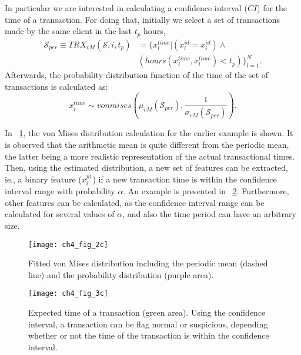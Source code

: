   In particular we are interested in calculating a confidence interval ($CI$)   for the time of a 
  transaction. For doing that, initially we select a set of transactions made by  the same client 
  in the last $t_p$ hours,
  \begin{align}\label{eq:4:pe_features1}
    \mathcal{S}_{per} \equiv TRX_{vM}(\mathcal{S},i, t_p) & = \bigg\{ x_l^{time} \bigg\vert   
    \left(x_l^{id}=x_i^{id}\right)\wedge \nonumber \\
    &\left(hours(x_i^{time},x_l^{time})< t_p\right)    \bigg\}_{l=1}^N.
  \end{align}
  Afterwards, the probability distribution function of the time of the set of transactions is 
  calculated as:
  \begin{equation}
   x_i^{time} \sim vonmises\left(\mu_{vM}(\mathcal{S}_{per}), 
  \frac{1}{\sigma_{vM}(\mathcal{S}_{per})} \right).
  \end{equation}
  
  
  In \figurename{~\ref{fig:4:von2}}, the von Mises distribution calculation for the  earlier 
  example is shown. It is observed that the arithmetic mean is quite different from the periodic  
mean, the latter being a more realistic representation of the actual transactional times. Then, 
using the estimated distribution,   a new set of features can be extracted, ie., a binary  
  feature ($x_i^{p1}$) if a new transaction time is within the confidence interval range with 
  probability   $\alpha$. An example is presented in \figurename{~\ref{fig:4:von3}}. 
  Furthermore, other features can be calculated, as the confidence interval range can be calculated 
  for several values of $\alpha$, and also the time period can have an arbitrary size.

  \begin{figure}[!t]
  \centering
  \texttt{[image: ch4\_fig\_2c]}
  \caption{Fitted von Mises distribution including the periodic mean (dashed line) and the 
    probability distribution (purple area).}
  \label{fig:4:von2}
  \end{figure} 
  
  \begin{figure}[!t]
  \centering
  \texttt{[image: ch4\_fig\_3c]}
  \caption{Expected time of a transaction (green area). Using     the confidence interval, a  
  transaction can be flag normal   or   suspicious, depending     whether or  not the time of 
  the   transaction is within the   confidence  interval.}
  \label{fig:4:von3}
  \end{figure} 
	
